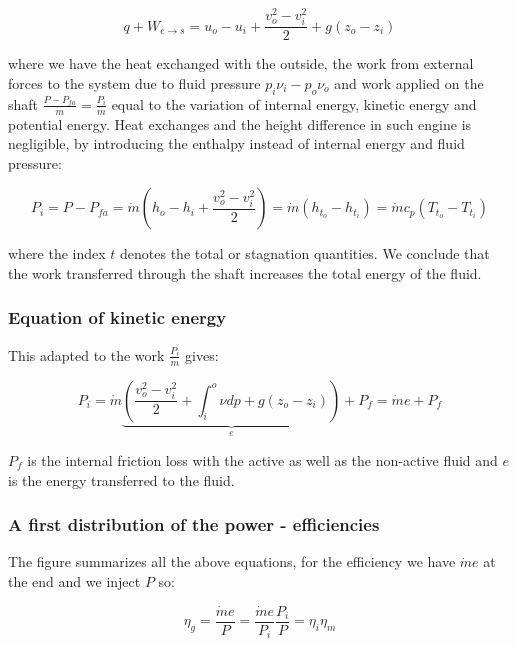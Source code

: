 \begin{equation}
q + W_{e\rightarrow s} = u_o - u_i + \frac{v_o ^2 - v_i^2}{2} + g(z_o - z_i)
\end{equation}

where we have the heat exchanged with the outside, the work from external forces to the system due to fluid pressure $p_i \nu _i - p_o\nu_o$ and work applied on the shaft $\frac{P - P_{fa}}{\dot{m}} =  \frac{P_i}{\dot{m}}$ equal to the variation of internal energy, kinetic energy and potential energy. Heat exchanges and the height difference in such engine is negligible, by introducing the enthalpy instead of internal energy and fluid pressure: 

\begin{equation}
P_i = P - P_{fa} = \dot{m}\left( h_o - h_i + \frac{v_o^2 - v_i^2}{2} \right) = \dot{m} (h_{t_o} - h_{t_i}) = \dot{m} c_p (T_{t_o} - T_{t_i})
\end{equation}

where the index $t$ denotes the total or stagnation quantities. We conclude that the work transferred through the shaft increases the total energy of the fluid. 

\subsubsection{Equation of kinetic energy}
This adapted to the work $\frac{P_i}{\dot{m}}$ gives: 

\begin{equation}
P_i = \dot{m} \underbrace{\left( \frac{v_o^2-v_i^2}{2} + \int _{i}^{o} \nu dp + g(z_o - z_i)\right)}_{e} + P_f = \dot{m} e + P_f
\end{equation}

$P_f$ is the internal friction loss with the active as well as the non-active fluid and $e$ is the energy transferred to the fluid. 

\subsubsection{A first distribution of the power - efficiencies}
The figure summarizes all the above equations, for the efficiency we have $\dot{m}e$ at the end and we inject $P$ so: 

\begin{equation}
\eta _{g} = \frac{\dot{m}e}{P} = \frac{\dot{m}e}{P_i} \frac{P_i}{P} = \eta _i \eta _m
\end{equation}

